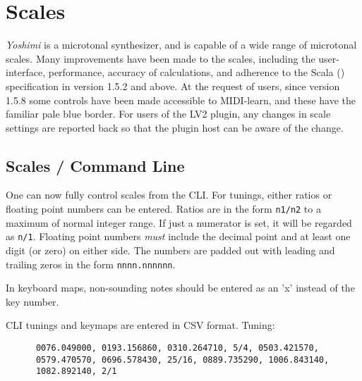 %
%
%

\section{Scales}
\label{sec:Scales}

   \textsl{Yoshimi} is a microtonal synthesizer, and is capable of a wide
   range of microtonal scales.  Many improvements have been made to the scales,
   including the user-interface, performance, accuracy of calculations, and
   adherence to the Scala (\cite{scala}) specification in version 1.5.2 and
   above. At the request of users, since version 1.5.8 some controls have been
   made accessible to MIDI-learn, and these have the familiar pale blue border.
   For users of the LV2 plugin, any changes in scale
   settings are reported back so that the plugin host can be aware of the
   change.

\subsection{Scales / Command Line}
\label{subsec:scales_command_line}

    One can now fully control scales from the CLI.
    For tunings, either ratios or floating point numbers can be entered.
    Ratios are in the form
    \texttt{n1/n2} to a maximum of normal integer range.
   If just a numerator is set, it will be regarded as \texttt{n/1}.
   Floating point numbers \textsl{must}
   include the decimal point and at least one digit (or zero) on either side.
   The numbers are padded out with leading and trailing zeros in the form
   \texttt{nnnn.nnnnnn}.

   In keyboard maps, non-sounding notes should be entered as an 'x' instead of
   the key number.

   CLI tunings and keymaps are entered in CSV format.
   Tuning:

   \begin{verbatim}
      0076.049000, 0193.156860, 0310.264710, 5/4, 0503.421570,
      0579.470570, 0696.578430, 25/16, 0889.735290, 1006.843140,
      1082.892140, 2/1
   \end{verbatim}

